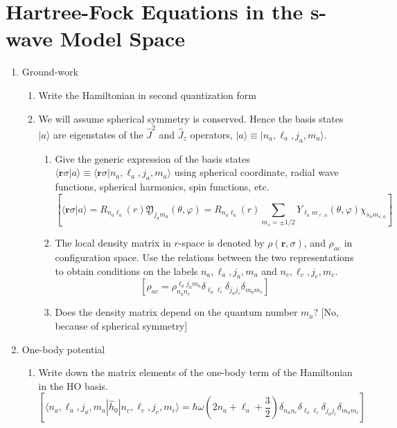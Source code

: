 \documentclass[letterpaper,11pt]{article}
\newcommand{\gras}[1]{\boldsymbol{#1}}
\begin{document}
\section{Hartree-Fock Equations in the s-wave Model Space}

\begin{enumerate}
\item Ground-work
\begin{enumerate}
\item Write the Hamiltonian in second quantization form
\item We will assume spherical symmetry is conserved. Hence the basis states $|a\rangle$ are eigenstates of the $\hat{J}^{2}$ and $\hat{J}_{z}$ operators, $|a\rangle \equiv |n_{a}, \ell_{a}, j_{a}, m_{a}\rangle$. 
\begin{enumerate}
\item Give the generic expression of the basis states $\langle \gras{r}\sigma | a\rangle \equiv \langle \gras{r}\sigma | n_{a}, \ell_{a}, j_{a}, m_{a}\rangle$ using spherical  coordinate, radial wave functions, spherical harmonics, spin functions, etc.
$$
[
\langle \gras{r}\sigma | a\rangle 
= R_{n_{a}\ell_{a}}(r)\mathfrak{Y}_{j_{a}m_{a}}(\theta,\varphi)
= R_{n_{a}\ell_{a}}(r)\sum_{m_{s}=\pm 1/2} Y_{\ell_{a}m_{\ell, a}}(\theta,\varphi)\chi_{s_{a}m_{s,a}}
]
$$
\item The local density matrix in $r$-space is denoted by $\rho(\gras{r},\sigma)$, and $\rho_{ac}$ in configuration space. Use the relations between the two representations to obtain conditions on the labels $n_{a}, \ell_{a}, j_{a}, m_{a}$ and $n_{c}, \ell_{c}, j_{c}, m_{c}$.
$$
[
\rho_{ac} = \rho_{n_{a}n_{c}}^{\ell_{a}j_{a}m_{a}}\delta_{\ell_{a}\ell_{c}}\delta_{j_{a}j_{c}}\delta_{m_{a}m_{c}}
]
$$
\item Does the density matrix depend on the quantum number $m_{a}$? 
[No, because of spherical symmetry]
\end{enumerate}
\end{enumerate}
\item One-body potential
\begin{enumerate}
\item Write down the matrix elements of the one-body term of the Hamiltonian in the HO basis.
$$
[
\langle n_{a}, \ell_{a}, j_{a}, m_{a} | \hat{h}_{0} | n_{c}, \ell_{c}, j_{c}, m_{c}\rangle
=
\hbar\omega\left( 2n_{a} + \ell_{a} + \frac{3}{2} \right)
\delta_{n_{a}n_{c}}\delta_{\ell_{a}\ell_{c}}\delta_{j_{a}j_{c}}\delta_{m_{a}m_{c}}
]
$$
\end{enumerate}

\end{enumerate}
\end{document}
